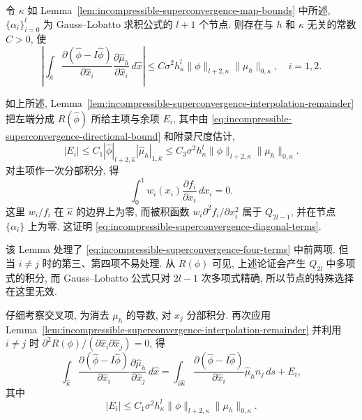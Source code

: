 \begin{Lemma}\label{lem:incompressible-superconvergence-diagonal-terms}
令 $\kappa$ 如
Lemma~\ref{lem:incompressible-superconvergence-map-bounds} 中所述,
$\{\alpha_i\}_{i=0}^l$ 为 Gauss--Lobatto 求积公式的 $l+1$ 个节点.
则存在与 $h$ 和 $\kappa$ 无关的常数 $C>0$, 使
\begin{equation}\label{eq:incompressible-superconvergence-diagonal-terms}
\left|
\int_{\widehat\kappa}
\frac{\partial(\widehat\phi-I\widehat\phi)}
{\partial\widehat x_i}
\frac{\partial\widehat\mu_h}{\partial\widehat x_i}
\,d\widehat x
\right|
\leq C\sigma^2h_\kappa^l
\|\phi\|_{l+2,\kappa}\|\mu_h\|_{0,\kappa},
\quad i=1,2.
\end{equation}
\end{Lemma}

\begin{Proof}
如上所述,
Lemma~\ref{lem:incompressible-superconvergence-interpolation-remainder}
把左端分成 $R(\widehat\phi)$ 所给主项与余项 $E_i$,
其中由
\eqref{eq:incompressible-superconvergence-directional-bound}
和附录尺度估计,
\[
|E_i|
\leq C_1|\widehat\phi|_{l+2,\widehat\kappa}
|\widehat\mu_h|_{1,\widehat\kappa}
\leq C_3\sigma^2h_\kappa^l
\|\phi\|_{l+2,\kappa}\|\mu_h\|_{0,\kappa}.
\]
对主项作一次分部积分, 得
\[
\int_0^1w_i(x_i)
\frac{\partial f_i}{\partial x_i}\,dx_i=0.
\]
这里 $w_i/f_i$ 在 $\widehat\kappa$ 的边界上为零,
而被积函数 $w_i\partial^2f_i/\partial x_i^2$
属于 $Q_{2l-1}$, 并在节点 $\{\alpha_i\}$ 上为零.
这证明 \eqref{eq:incompressible-superconvergence-diagonal-terms}.
\end{Proof}

该 Lemma 处理了
\eqref{eq:incompressible-superconvergence-four-terms}
中前两项. 但当 $i\ne j$ 时的第三、第四项不易处理.
从 $R(\phi)$ 可见, 上述论证会产生 $Q_{2l}$ 中多项式的积分,
而 Gauss--Lobatto 公式只对 $2l-1$ 次多项式精确,
所以节点的特殊选择在这里无效.

仔细考察交叉项, 为消去 $\mu_h$ 的导数,
对 $\widehat x_j$ 分部积分.
再次应用 Lemma~\ref{lem:incompressible-superconvergence-interpolation-remainder}
并利用 $i\ne j$ 时
$\partial^2R(\phi)/(\partial\widehat x_i\partial\widehat x_j)=0$, 得
\[
\int_{\widehat\kappa}
\frac{\partial(\widehat\phi-I\widehat\phi)}
{\partial\widehat x_i}
\frac{\partial\widehat\mu_h}{\partial\widehat x_j}
\,d\widehat x
=\int_{\partial\widehat\kappa}
\frac{\partial(\widehat\phi-I\widehat\phi)}
{\partial\widehat x_i}\widehat\mu_h n_j\,ds+E_i,
\]
其中
\begin{equation}\label{eq:incompressible-superconvergence-cross-remainder}
|E_i|\leq C_1\sigma^2h_\kappa^l
\|\phi\|_{l+2,\kappa}\|\mu_h\|_{0,\kappa}.
\end{equation}

